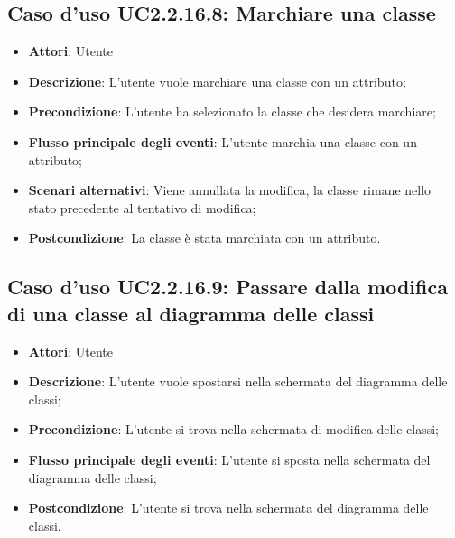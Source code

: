 \documentclass[../AnalisiDeiRequisiti.tex]{subfiles}
\begin{document}
			\subsection{Caso d'uso UC2.2.16.8: Marchiare una classe}
			\begin{itemize}
				\item \textbf{Attori}: Utente
				\item \textbf{Descrizione}: L'utente vuole marchiare una classe con un attributo;
				\item \textbf{Precondizione}: L'utente ha selezionato la classe che desidera marchiare;
				\item \textbf{Flusso principale degli eventi}: L'utente marchia una classe con un attributo;
				\item \textbf{Scenari alternativi}: Viene annullata la modifica, la classe rimane nello stato precedente al tentativo di modifica;
				\item \textbf{Postcondizione}: La classe è stata marchiata con un attributo.
			\end{itemize}
			\subsection{Caso d'uso UC2.2.16.9: Passare dalla modifica di una classe al diagramma delle classi}
			\begin{itemize}
				\item \textbf{Attori}: Utente
				\item \textbf{Descrizione}: L'utente vuole spostarsi nella schermata del diagramma delle classi;
				\item \textbf{Precondizione}: L'utente si trova nella schermata di modifica delle classi;
				\item \textbf{Flusso principale degli eventi}: L'utente si sposta nella schermata del diagramma delle classi;
				\item \textbf{Postcondizione}: L'utente si trova nella schermata del diagramma delle classi.
			\end{itemize}
\end{document}
